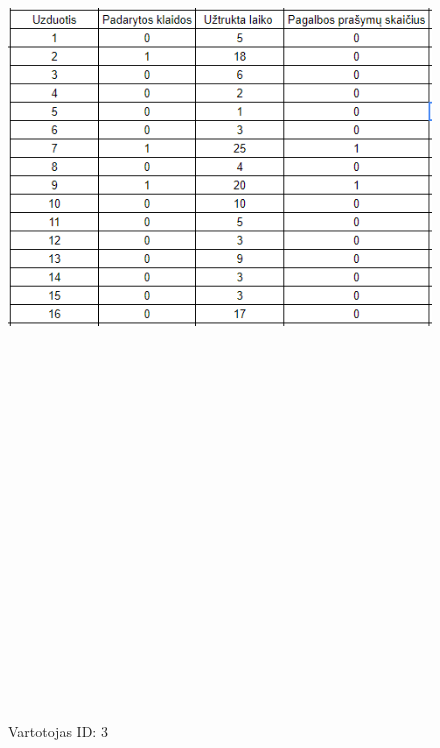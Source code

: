 \documentclass[oneside]{VUMIFPSkursinis}
\begin{document}
	\begin{figure}[h]
			\centering
			\includegraphics[width=15cm,height=60cm,keepaspectratio]{3.png}
			\caption{ Vartotojas ID: 3}
	\end{figure}
	
\end{document}
